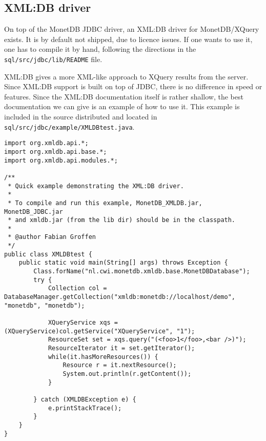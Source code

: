 \documentclass{article}
\begin{document}
\subsection{XML:DB driver}
On top of the MonetDB JDBC driver, an XML:DB driver for MonetDB/XQuery
exists.  It is by default not shipped, due to licence issues.  If one
wants to use it, one has to compile it by hand, following the directions
in the \texttt{sql/src/jdbc/lib/README} file.

XML:DB gives a more XML-like approach to XQuery results from the server.
Since XML:DB support is built on top of JDBC, there is no difference in
speed or features.  Since the XML:DB documentation itself is rather
shallow, the best documentation we can give is an example of how to use
it.  This example is included in the source distributed and located in
\texttt{sql/src/jdbc/example/XMLDBtest.java}.

\begin{verbatim}
import org.xmldb.api.*;
import org.xmldb.api.base.*;
import org.xmldb.api.modules.*;

/**
 * Quick example demonstrating the XML:DB driver.
 *
 * To compile and run this example, MonetDB_XMLDB.jar, MonetDB_JDBC.jar
 * and xmldb.jar (from the lib dir) should be in the classpath.
 *
 * @author Fabian Groffen
 */
public class XMLDBtest {
    public static void main(String[] args) throws Exception {
        Class.forName("nl.cwi.monetdb.xmldb.base.MonetDBDatabase");
        try {
            Collection col = DatabaseManager.getCollection("xmldb:monetdb://localhost/demo", "monetdb", "monetdb"); 

            XQueryService xqs = (XQueryService)col.getService("XQueryService", "1");
            ResourceSet set = xqs.query("(<foo>1</foo>,<bar />)");
            ResourceIterator it = set.getIterator();
            while(it.hasMoreResources()) {
                Resource r = it.nextResource();
                System.out.println(r.getContent());
            }
            
        } catch (XMLDBException e) {
            e.printStackTrace();
        }
    }
}
\end{verbatim}
\end{document}
